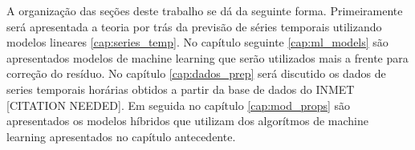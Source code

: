 A organização das seções deste trabalho se dá da seguinte forma. Primeiramente será apresentada a teoria por trás da previsão de séries temporais utilizando modelos lineares \ref{cap:series_temp}. No capítulo seguinte \ref{cap:ml_models} são apresentados modelos de machine learning que serão utilizados mais a frente para correção do resíduo.
No capítulo \ref{cap:dados_prep} será discutido os dados de series temporais horárias obtidos a partir da base de dados do INMET [CITATION NEEDED]. Em seguida no capítulo \ref{cap:mod_props} são apresentados os modelos híbridos que utilizam dos algorítmos de machine learning apresentados no capítulo antecedente.